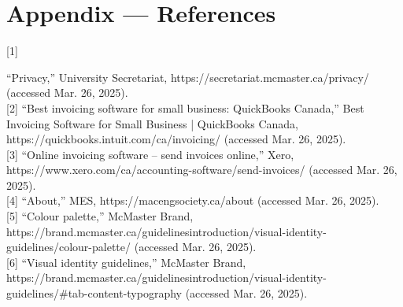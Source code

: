 \documentclass[12pt]{article}
\begin{document}
\section*{Appendix --- References}
    \hypertarget{Ref1}{[1]} “Privacy,” University Secretariat, https://secretariat.mcmaster.ca/privacy/ (accessed Mar. 26, 2025). \\
    \hypertarget{Ref2}{[2]} “Best invoicing software for small business: QuickBooks Canada,” Best Invoicing Software for Small Business | QuickBooks Canada, https://quickbooks.intuit.com/ca/invoicing/ (accessed Mar. 26, 2025). \\
    \hypertarget{Ref3}{[3]} “Online invoicing software – send invoices online,” Xero, https://www.xero.com/ca/accounting-software/send-invoices/ (accessed Mar. 26, 2025). \\
    \hypertarget{Ref4}{[4] “About,” MES, https://macengsociety.ca/about (accessed Mar. 26, 2025).} \\
    \hypertarget{Ref5}{[5] “Colour palette,” McMaster Brand, https://brand.mcmaster.ca/guidelines\textunderscore introduction/visual-identity-guidelines/colour-palette/ (accessed Mar. 26, 2025).} \\
    \hypertarget{Ref6}{[6] “Visual identity guidelines,” McMaster Brand, https://brand.mcmaster.ca/guidelines\textunderscore introduction/visual-identity-guidelines/\#tab-content-typography (accessed Mar. 26, 2025).}\\
\end{document}
